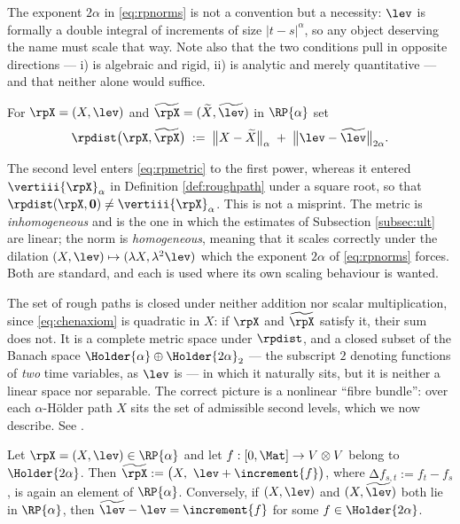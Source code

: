 The exponent $2\alpha$ in \eqref{eq:rpnorms} is not a convention but a necessity: $\lev$ is
formally a double integral of increments of size $|t-s|^\alpha$, so any object deserving the name
must scale that way. Note also that the two conditions pull in opposite directions --- i) is
algebraic and rigid, ii) is analytic and merely quantitative --- and that neither alone would
suffice.

\begin{definition}\label{def:rpmetric}
For $\rpX = (X,\lev)$ and $\widetilde{\rpX} = (\widetilde X, \widetilde\lev)$ in $\RP{\alpha}$ set
\begin{equation}\label{eq:rpmetric}
\rpdist\bigl(\rpX,\widetilde{\rpX}\bigr) \;:=\; \bigl\lVert X - \widetilde X\bigr\rVert_{\alpha} \;+\; \bigl\lVert \lev - \widetilde\lev\bigr\rVert_{2\alpha}.
\end{equation}
\end{definition}

The second level enters \eqref{eq:rpmetric} to the first power, whereas it entered
$\vertiii{\rpX}_\alpha$ in Definition \ref{def:roughpath} under a square root, so that
$\rpdist(\rpX,\mathbf{0}) \neq \vertiii{\rpX}_\alpha$. This is not a misprint. The metric is
\emph{inhomogeneous} and is the one in which the estimates of Subsection \ref{subsec:ult} are
linear; the norm is \emph{homogeneous}, meaning that it scales correctly under the dilation
$(X,\lev)\mapsto(\lambda X,\lambda^2\lev)$ which the exponent $2\alpha$ of \eqref{eq:rpnorms}
forces. Both are standard, and each is used where its own scaling behaviour is wanted.

\begin{remark}\label{rem:notvectorspace}
The set of rough paths is closed under neither addition nor scalar multiplication, since
\eqref{eq:chenaxiom} is quadratic in $X$: if $\rpX$ and $\widetilde\rpX$ satisfy it, their sum does
not. It is a complete metric space under $\rpdist$, and a closed subset of the Banach space
$\Holder{\alpha}\oplus \Holder{2\alpha}_2$ --- the subscript $2$ denoting functions of \emph{two}
time variables, as $\lev$ is --- in which it naturally sits, but it is neither a linear
space nor separable. The correct picture is a nonlinear ``fibre bundle'': over each $\alpha$-Hölder
path $X$ sits the set of admissible second levels, which we now describe. See \cite[Ch.\ 2]{frizhairer2020}.
\end{remark}

\begin{proposition}\label{prop:liftnotunique}
Let $\rpX = (X,\lev) \in \RP{\alpha}$ and let $f : [0,\Mat] \to V\otimes V$ belong to
$\Holder{2\alpha}$. Then $\widetilde\rpX := \bigl(X,\ \lev + \increment{f}\bigr)$, where
$\increment{f}_{s,t} := f_t - f_s$, is again an element of $\RP{\alpha}$. Conversely, if
$(X,\lev)$ and $(X,\widetilde\lev)$ both lie in $\RP{\alpha}$, then
$\widetilde\lev - \lev = \increment{f}$ for some $f \in \Holder{2\alpha}$.
\end{proposition}

